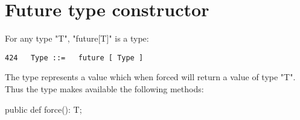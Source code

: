 \section{Future type constructor}
For any type \xcd"T", \xcd"future[T]" is a type:
\begin{verbatim}
424   Type ::=   future [ Type ] 
\end{verbatim}
The type  represents a value which when forced will return a value of type
\xcd"T". Thus the type makes available the following methods:

\begin{xten}
  public def force(): T;
\end{xten}

